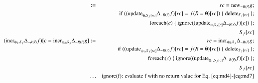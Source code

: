 \documentclass{article}
\begin{document}
\begin{figure*}
\begin{eqnarray}
&:=&
rc = \mathrm{new}_{-R(\vec{r})} g;
\\
\nonumber &&
\mbox{if ($(\mathrm{update}_{\oplus, S_f[rc]} \Delta_{-R(\vec{r})} f)[rc] = f(R = \emptyset)[rc]$)}
\; \{ \; \mathrm{delete}_{S_f[rc]} \; \};
\\
\nonumber &&
\mathrm{foreach}(c) \; \{ \; \mathrm{ignore}((\mathrm{update}_{\oplus, S_f[c]}\Delta_{-R(\vec{r})} f)[c]) \; \};
\\
\nonumber && S_f[rc]
\\
\label{eq:md7}
(\mathrm{incr}_{\oplus_1, S_f} \Delta_{-R(\vec{r})} f)[c = \mathrm{incr}_{\oplus_2,S_g} \Delta_{-R(\vec{r})} g]
&:=&
rc = \mathrm{incr}_{\oplus_2, S_g} \Delta_{-R(\vec{r})} g;
\\
\nonumber &&
\mbox{if ($(\mathrm{update}_{\oplus_1, S_f[rc]} \Delta_{-R(\vec{r})} f)[rc] = f(R = \emptyset)[rc]$)}
\; \{ \; \mathrm{delete}_{S_f[rc]} \; \};
\\
\nonumber &&
\mathrm{foreach}(c) \; \{ \; \mathrm{ignore}((\mathrm{update}_{\oplus_1, S_f[c]}\Delta_{-R(\vec{r})} f)[c]) \; \};
\\
\nonumber && S_f[rc] \\
\nonumber &\dots& \mbox{ignore(f): evaluate f with no return value for Eq.~\ref{eq:md4}-\ref{eq:md7}}
\end{eqnarray}
\end{figure*}
\end{document}
